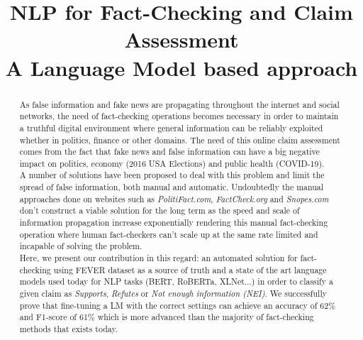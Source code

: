 \documentclass[conference]{IEEEtran}
\begin{document}
\title{NLP for Fact-Checking and Claim Assessment\\
{\Large A Language Model based approach}
}

\author{
\and
{}
}

\maketitle

\begin{abstract}
As false information and fake news are propagating throughout the internet and social networks, the need of fact-checking operations becomes necessary in order to maintain a truthful digital environment where general information can be reliably exploited whether in politics, finance or other domains. The need of this online claim assessment comes from the fact that fake news and false information can have a big negative impact on politics, economy (2016 USA Elections) and public health (COVID-19).\\ 
A number of solutions have been proposed to deal with this problem and limit the spread of false information, both manual and automatic. Undoubtedly the manual approaches done on websites such as \textit{PolitiFact.com}, \textit{FactCheck.org} and \textit{Snopes.com} don't construct a viable solution for the long term as the speed and scale of information propagation increase exponentially rendering this manual fact-checking operation where human fact-checkers can't scale up at the same rate limited and incapable of solving the problem.\\
Here, we present our contribution in this regard: an automated solution for fact-checking using FEVER dataset as a source of truth and a state of the art language models used today for NLP tasks (BERT, RoBERTa, XLNet...) in order to classify a given claim as \textit{Supports}, \textit{Refutes} or \textit{Not enough information (NEI)}. We successfully prove that fine-tuning a LM with the correct settings can achieve an accuracy of 62\% and F1-score of 61\% which is more advanced than the majority of fact-checking methods that exists today.\\
\end{abstract}
\end{document}
